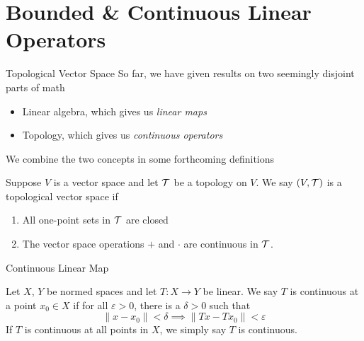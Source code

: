 \documentclass[10pt]{beamer}
\begin{document}
		\section{Bounded \& Continuous Linear Operators}

		\begin{frame}{Topological Vector Space}
				So far, we have given results on two seemingly disjoint parts of math 
				\begin{itemize}
						\item Linear algebra, which gives us \emph{linear maps}
						\item Topology, which gives us \emph{continuous operators}
				\end{itemize}
				We combine the two concepts in some forthcoming definitions 
				\begin{definition}
						Suppose $V$ is a vector space and let $\mathcal{T}$ be a topology on $V$. We say $(V, \mathcal{T})$ is a \alert{topological vector space} if 
						\begin{enumerate}
								\item All one-point sets in $\mathcal{T}$ are closed 
								\item The vector space operations $+$ and $\cdot$ are continuous in $\mathcal{T}$.
						\end{enumerate}
				\end{definition}
		\end{frame}

		\begin{frame}{Continuous Linear Map}
				\begin{definition}
						Let $X$, $Y$ be normed spaces and let $T: X\to Y$ be linear. We say $T$ is \alert{continuous} at a point $x_0\in X$ if for all $\varepsilon > 0$, there is a $\delta > 0$ such that 
						\begin{equation*}
								\| x - x_0 \| < \delta \implies \|Tx - Tx_0\| < \varepsilon
						\end{equation*}
						If $T$ is continuous at all points in $X$, we simply say $T$ is \alert{continuous}.
				\end{definition}
		\end{frame}
\end{document}

